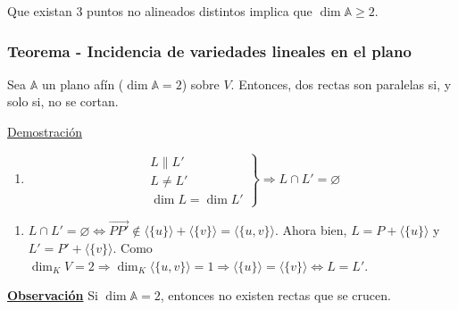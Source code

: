 \documentclass[12pt, a4paper, ones, notitlepage, openany,titlepage]{article}
\newcommand{\demostracion}{\noindent\underline{Demostración}}
\newcommand{\observacion}{\noindent\underline{\textbf{Observación}}}
\begin{document}
\noindent Que existan 3 puntos no alineados distintos implica que $\dim \mathbb{A} \ge 2$.

\subsubsection{Teorema - Incidencia de variedades lineales en el plano}
Sea $\mathbb{A}$ un plano afín ($\dim \mathbb{A} = 2$) sobre $V$. Entonces, dos rectas son paralelas si, y solo si, no se cortan.

\demostracion
\begin{enumerate}[label=$\Longrightarrow/$]
	\item $$
	\left. \begin{array}{r}
		L \| L' \\
		L \neq L' \\
		\dim L = \dim L'
	\end{array} \right\} \Longrightarrow L \cap L' = \varnothing
	$$
\end{enumerate}
\begin{enumerate}[label=$\Longleftarrow/$]
	\item $L \cap L' = \varnothing \Longleftrightarrow \overrightarrow{PP'} \notin \langle\{u\}\rangle + \langle\{v\}\rangle = \langle\{u,v\}\rangle$. Ahora bien, $L = P + \langle\{u\}\rangle$ y $L' = P' + \langle\{v\}\rangle$. Como $\dim_K V = 2 \Longrightarrow \dim_K \langle\{u,v\}\rangle = 1 \Longrightarrow \langle\{u\}\rangle = \langle\{v\}\rangle \Longleftrightarrow L = L'$.
\end{enumerate}
\observacion
\noindent Si $\dim \mathbb{A} = 2$, entonces no existen rectas que se crucen.
\end{document}
